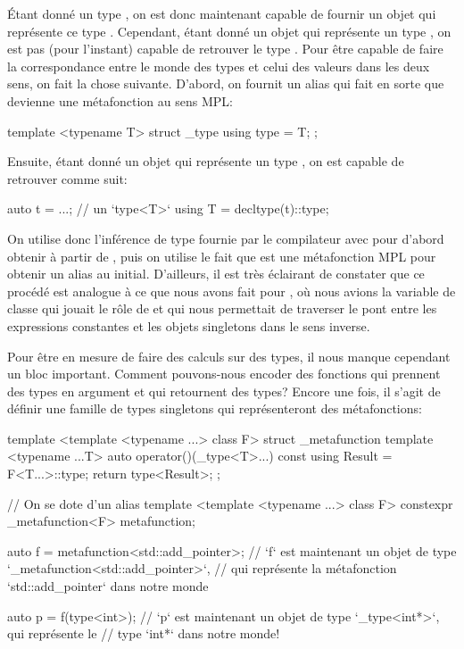 Étant donné un type , on est donc maintenant capable de fournir un
objet qui représente ce type . Cependant, étant donné un objet qui
représente un type , on est pas (pour l'instant) capable de retrouver
le type . Pour être capable de faire la correspondance entre le monde
des types et celui des valeurs dans les deux sens, on fait la chose suivante.
D'abord, on fournit un alias qui fait en sorte que  devienne
une métafonction au sens MPL:
\begin{cpp}
    template <typename T>
    struct _type {
        using type = T;
    };
\end{cpp}

Ensuite, étant donné un objet qui représente un type , on est capable
de retrouver  comme suit:
\begin{cpp}
    auto t = ...; // un `type<T>`
    using T = decltype(t)::type;
\end{cpp}

On utilise donc l'inférence de type fournie par le compilateur avec
 pour d'abord obtenir  à partir de ,
puis on utilise le fait que  est une métafonction MPL pour
obtenir un alias au  initial. D'ailleurs, il est très éclairant de
constater que ce procédé est analogue à ce que nous avons fait pour
, où nous avions la variable de classe 
qui jouait le rôle de  et qui nous permettait de traverser le pont
entre les expressions constantes et les objets singletons dans le sens inverse.

Pour être en mesure de faire des calculs sur des types, il nous manque
cependant un bloc important. Comment pouvons-nous encoder des fonctions
qui prennent des types en argument et qui retournent des types? Encore une
fois, il s'agit de définir une famille de types singletons qui représenteront
des métafonctions:
\begin{cpp}
    template <template <typename ...> class F>
    struct _metafunction {
        template <typename ...T>
        auto operator()(_type<T>...) const {
            using Result = F<T...>::type;
            return type<Result>;
        }
    };

    // On se dote d'un alias
    template <template <typename ...> class F>
    constexpr _metafunction<F> metafunction{};

    auto f = metafunction<std::add_pointer>;
    // `f` est maintenant un objet de type `_metafunction<std::add_pointer>`,
    // qui représente la métafonction `std::add_pointer` dans notre monde

    auto p = f(type<int>);
    // `p` est maintenant un objet de type `_type<int*>`, qui représente le
    // type `int*` dans notre monde!
\end{cpp}

